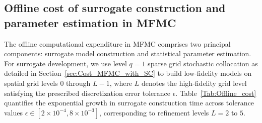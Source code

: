 



\subsection{Offline cost of surrogate construction and parameter estimation in MFMC}
The offline computational expenditure in MFMC comprises two principal components: surrogate model construction and statistical parameter estimation. For surrogate development, we use level $q=1$ sparse grid stochastic collocation as detailed in Section~\ref{sec:Cost_MFMC_with_SC} to build low-fidelity models on spatial grid levels $0$ through $L-1$, where $L$ denotes the high-fidelity grid level satisfying the prescribed discretization error tolerance $\epsilon$. Table~\ref{Tab:Offline_cost} quantifies the exponential growth in surrogate construction time across tolerance values $\epsilon \in [2\times 10^{-4}, 8\times 10^{-3}]$, corresponding to refinement levels $L = 2$ to $5$.


